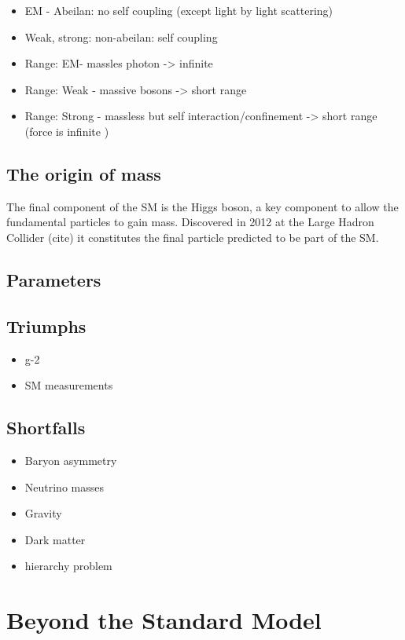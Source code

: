 {\color{Red}
\begin{itemize}
\item EM - Abeilan: no self coupling (except light by light scattering)
\item Weak, strong: non-abeilan: self coupling
\item Range: EM- massles photon -> infinite 
\item Range: Weak - massive bosons -> short range
\item Range: Strong - massless but self interaction/confinement -> short range (force is infinite )
\end{itemize}}


\subsection{The origin of mass}
The final component of the SM is the Higgs boson, a key component to allow the fundamental particles to gain mass. Discovered in 2012 at the Large Hadron Collider (cite) it constitutes the final particle predicted to be part of the SM. 

\subsection{Parameters}


\subsection{Triumphs}

\begin{itemize}
\item g-2
\item SM measurements
\end{itemize}

\subsection{Shortfalls}
\begin{itemize}
\item Baryon asymmetry 
\item Neutrino masses
\item Gravity
\item Dark matter
\item hierarchy problem
\end{itemize}
\section{Beyond the Standard Model}

